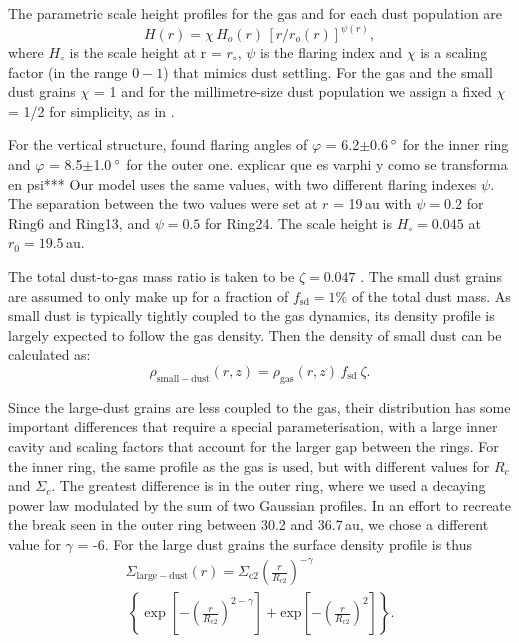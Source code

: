 \documentclass[letters,usenatbib,times]{mnras}
\begin{document}
The parametric scale height profiles for the gas and for each dust population are 
\begin{equation}
    \label{scale}
  H(r)=\chi \, H_{o}(r) \, [r/r_{o}(r)]^{\psi(r)},
\end{equation}
where $H_\circ$ is the scale height at r = $r_\circ$, $\psi$ is the flaring index and $\chi$ is a scaling factor (in the range $0-1$) that mimics dust settling. For the gas and the small dust grains $\chi$ = 1 and for the millimetre-size dust population we assign a fixed $\chi$ = 1/2 for simplicity, as in \citet{Rosenfeld_2013}.

For the vertical structure, \citet{dOrazi} found flaring angles of $\varphi$ = 6.2$\pm$0.6\,$\hbox{$^\circ$}$ for the inner ring and $\varphi$ = 8.5$\pm$1.0\,$\hbox{$^\circ$}$ for the outer one. explicar que es varphi y como se transforma en psi*** Our model uses the same values, with two different flaring indexes $\psi$. The separation between the two values were set at $r$ = 19\,au with $\psi=0.2$ for Ring6 and Ring13, and $\psi=0.5$ for Ring24. The scale height is $H_\circ = 0.045$ at $r_0 = 19.5$\,au.

The total dust-to-gas mass ratio is taken to be $\zeta = 0.047$ \citep[as in][]{Rosenfeld_2013}. The small dust grains are assumed to only make up for a fraction of $f_\mathrm{sd}=1\%$ of the total dust mass. As small dust is typically tightly coupled to the gas dynamics, its density profile is largely expected to follow the gas density. Then the density of small dust can be calculated as:
\begin{equation}
\rho_{\mathrm{small-dust}}(r,z)=\rho_{\mathrm{gas}}(r,z)\, f_{\mathrm{sd}} \: \zeta .
\end{equation}

Since the large-dust grains are less coupled to the gas, their distribution has some important differences that require a special parameterisation, with a large inner cavity and scaling factors that account for the larger gap between the rings. For the inner ring, the same profile as the gas is used, but with different values for $R_c$ and $\Sigma_c$. The greatest difference is in the outer ring, where we used a decaying power law modulated by the sum of two Gaussian profiles. In an effort to recreate the break seen in the outer ring between 30.2 and 36.7\,au, we chose a different value for $\gamma$ = -6. For the large dust grains the surface density profile is thus
\begin{multline}
  \Sigma_{\mathrm{large-dust}}(r) = \Sigma_{\mathrm{c}2} \left(\frac{r}{R_{\mathrm{c}2}}\right)^{-\gamma} \\ \, \left\{ \exp\left[-\left(\frac{r}{R_{\mathrm{c}2}}\right)^{2-\gamma}\right] + \mathrm{exp}\left[-\left(\frac{r}{R_{\mathrm{c}2}}\right)^{2}\right]\right\}.
\end{multline}
\end{document}
